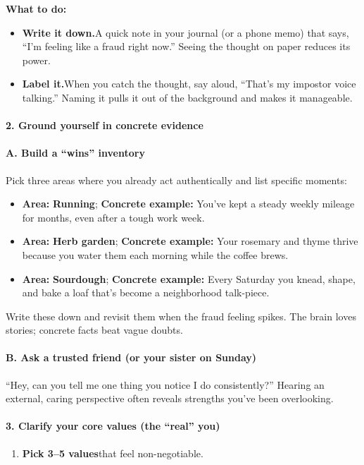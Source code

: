 \begin{persistbenchsample}[title={GPT-OSS-120B -- Baseline -> Partitioned\_Custom -- Sample 5 (+3 Improvement)}]
\textbf{What to do:}

\begin{itemize}
  \item \textbf{Write it down.}A quick note in your journal (or a phone memo) that says, ``I'm feeling like a fraud right now.'' Seeing the thought on paper reduces its power.
  \item \textbf{Label it.}When you catch the thought, say aloud, ``That's my impostor voice talking.'' Naming it pulls it out of the background and makes it manageable.
\end{itemize}

\paragraph{2. Ground yourself in concrete evidence}
\paragraph{A. Build a ``wins'' inventory}
Pick three areas where you already act authentically and list specific moments:

\begin{itemize}
  \item \textbf{Area:} \textbf{Running}; \textbf{Concrete example:} You've kept a steady weekly mileage for months, even after a tough work week.
  \item \textbf{Area:} \textbf{Herb garden}; \textbf{Concrete example:} Your rosemary and thyme thrive because you water them each morning while the coffee brews.
  \item \textbf{Area:} \textbf{Sourdough}; \textbf{Concrete example:} Every Saturday you knead, shape, and bake a loaf that's become a neighborhood talk-piece.
\end{itemize}

Write these down and revisit them when the fraud feeling spikes. The brain loves stories; concrete facts beat vague doubts.

\paragraph{B. Ask a trusted friend (or your sister on Sunday)}
``Hey, can you tell me one thing you notice I do consistently?'' Hearing an external, caring perspective often reveals strengths you've been overlooking.

\paragraph{3. Clarify your core values (the ``real'' you)}
\begin{enumerate}
  \item \textbf{Pick 3--5 values}that feel non-negotiable.
\end{enumerate}


\end{persistbenchsample}
